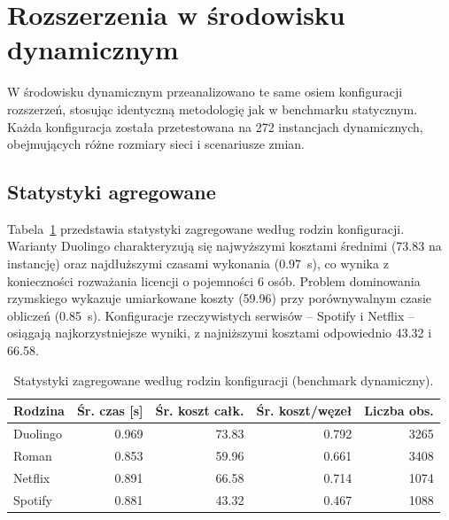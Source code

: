 \section{Rozszerzenia w środowisku dynamicznym}

W środowisku dynamicznym przeanalizowano te same osiem konfiguracji rozszerzeń, stosując identyczną metodologię jak w benchmarku statycznym. Każda konfiguracja została przetestowana na 272 instancjach dynamicznych, obejmujących różne rozmiary sieci i scenariusze zmian.

\subsection{Statystyki agregowane}

Tabela~\ref{tab:ext-dynamic-family} przedstawia statystyki zagregowane według rodzin konfiguracji. Warianty Duolingo charakteryzują się najwyższymi kosztami średnimi (73.83 na instancję) oraz najdłuższymi czasami wykonania (\SI{0.97}{\second}), co wynika z konieczności rozważania licencji o pojemności 6 osób. Problem dominowania rzymskiego wykazuje umiarkowane koszty (59.96) przy porównywalnym czasie obliczeń (\SI{0.85}{\second}). Konfiguracje rzeczywistych serwisów -- Spotify i Netflix -- osiągają najkorzystniejsze wyniki, z najniższymi kosztami odpowiednio 43.32 i 66.58.

\begin{table}[H]
    \centering
    \caption{Statystyki zagregowane według rodzin konfiguracji (benchmark dynamiczny).}
    \label{tab:ext-dynamic-family}
    \begin{tabular}{lrrrr}
        \toprule
        \textbf{Rodzina} & \textbf{Śr. czas [s]} & \textbf{Śr. koszt całk.} & \textbf{Śr. koszt/węzeł} & \textbf{Liczba obs.} \\
        \midrule
        Duolingo         & 0.969                 & 73.83                    & 0.792                    & 3265                 \\
        Roman            & 0.853                 & 59.96                    & 0.661                    & 3408                 \\
        Netflix          & 0.891                 & 66.58                    & 0.714                    & 1074                 \\
        Spotify          & 0.881                 & 43.32                    & 0.467                    & 1088                 \\
        \bottomrule
    \end{tabular}
\end{table}

